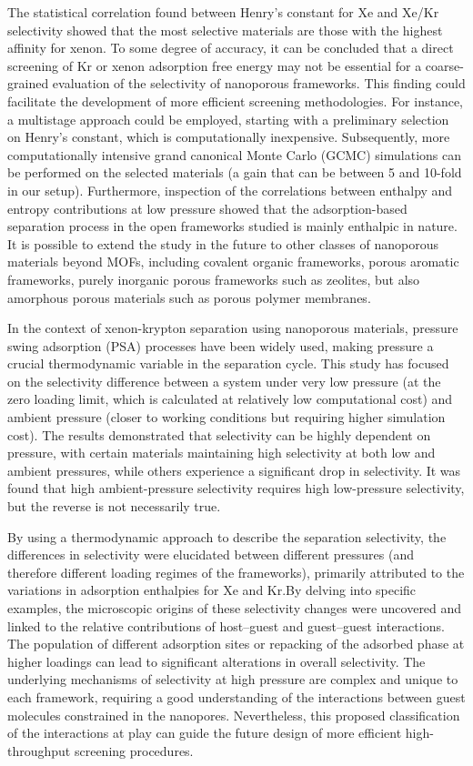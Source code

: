 \documentclass[main.tex]{subfiles}
\begin{document}
The statistical correlation found between Henry's constant for Xe and Xe/Kr selectivity showed that the most selective materials are those with the highest affinity for xenon. To some degree of accuracy, it can be concluded that a direct screening of Kr or xenon adsorption free energy may not be essential for a coarse-grained evaluation of the selectivity of nanoporous frameworks. This finding could facilitate the development of more efficient screening methodologies. For instance, a multistage approach could be employed, starting with a preliminary selection on Henry's constant, which is computationally inexpensive. Subsequently, more computationally intensive grand canonical Monte Carlo (GCMC) simulations can be performed on the selected materials (a gain that can be between 5 and 10-fold in our setup). Furthermore, inspection of the correlations between enthalpy and entropy contributions at low pressure showed that the adsorption-based separation process in the open frameworks studied is mainly enthalpic in nature. It is possible to extend the study in the future to other classes of nanoporous materials beyond MOFs, including covalent organic frameworks, porous aromatic frameworks, purely inorganic porous frameworks such as zeolites, but also amorphous porous materials such as porous polymer membranes.

In the context of xenon-krypton separation using nanoporous materials, pressure swing adsorption (PSA) processes have been widely used, making pressure a crucial thermodynamic variable in the separation cycle. This study has focused on the selectivity difference between a system under very low pressure (at the zero loading limit, which is calculated at relatively low computational cost) and ambient pressure (closer to working conditions but requiring higher simulation cost). The results demonstrated that selectivity can be highly dependent on pressure, with certain materials maintaining high selectivity at both low and ambient pressures, while others experience a significant drop in selectivity. It was found that high ambient-pressure selectivity requires high low-pressure selectivity, but the reverse is not necessarily true.

By using a thermodynamic approach to describe the separation selectivity, the differences in selectivity were elucidated between different pressures (and therefore different loading regimes of the frameworks), primarily attributed to the variations in adsorption enthalpies for Xe and Kr.By delving into specific examples, the microscopic origins of these selectivity changes were uncovered and linked to the relative contributions of host--guest and guest--guest interactions. The population of different adsorption sites or repacking of the adsorbed phase at higher loadings can lead to significant alterations in overall selectivity. The underlying mechanisms of selectivity at high pressure are complex and unique to each framework, requiring a good understanding of the interactions between guest molecules constrained in the nanopores. Nevertheless, this proposed classification of the interactions at play can guide the future design of more efficient high-throughput screening procedures.
\end{document}
